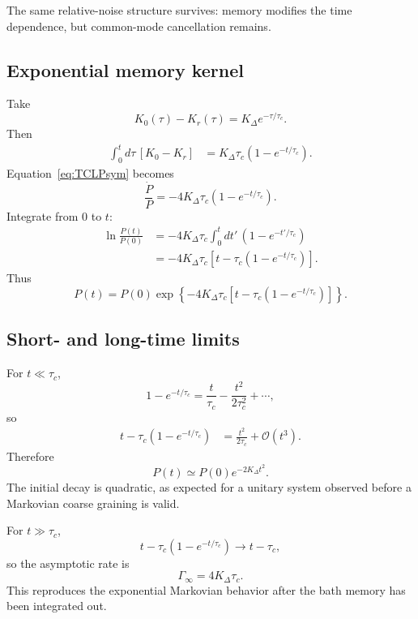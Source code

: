 \documentclass[11pt]{article}
\begin{document}
The same relative-noise structure survives: memory modifies the time dependence, but common-mode cancellation remains.

\subsection{Exponential memory kernel}

Take
\begin{equation}
K_0(\tau)-K_r(\tau)
=K_\Delta e^{-\tau/\tau_c}.
\label{eq:expkernel}
\end{equation}
Then
\begin{align}
\int_0^t d\tau\,[K_0-K_r]
&=K_\Delta\tau_c(1-e^{-t/\tau_c}).
\end{align}
Equation~\eqref{eq:TCLPsym} becomes
\begin{equation}
\frac{\dot P}{P}
=-4K_\Delta\tau_c(1-e^{-t/\tau_c}).
\end{equation}
Integrate from $0$ to $t$:
\begin{align}
\ln\frac{P(t)}{P(0)}
&=-4K_\Delta\tau_c
\int_0^t dt'\,(1-e^{-t'/\tau_c})\\
&=-4K_\Delta\tau_c
\left[t-\tau_c(1-e^{-t/\tau_c})\right].
\end{align}
Thus
\begin{equation}
\boxed{
P(t)=P(0)
\exp\left\{
-4K_\Delta\tau_c
\left[t-\tau_c(1-e^{-t/\tau_c})\right]
\right\}.
}
\label{eq:memorysolution}
\end{equation}

\subsection{Short- and long-time limits}

For $t\ll\tau_c$,
\begin{equation}
1-e^{-t/\tau_c}
=\frac{t}{\tau_c}-\frac{t^2}{2\tau_c^2}+\cdots,
\end{equation}
so
\begin{align}
t-\tau_c(1-e^{-t/\tau_c})
&=\frac{t^2}{2\tau_c}+\mathcal O(t^3).
\end{align}
Therefore
\begin{equation}
P(t)
\simeq
P(0)e^{-2K_\Delta t^2}.
\label{eq:quadratic}
\end{equation}
The initial decay is quadratic, as expected for a unitary system observed before a Markovian coarse graining is valid.

For $t\gg\tau_c$,
\begin{equation}
t-\tau_c(1-e^{-t/\tau_c})\to t-\tau_c,
\end{equation}
so the asymptotic rate is
\begin{equation}
\Gamma_{\infty}=4K_\Delta\tau_c.
\end{equation}
This reproduces the exponential Markovian behavior after the bath memory has been integrated out.
\end{document}
